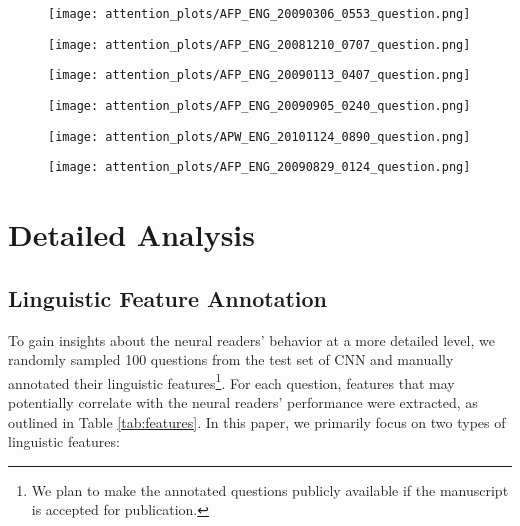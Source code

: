 \documentclass[11pt,a4paper]{article}
\begin{document}
\begin{figure*}[h]
\centering
\caption{Layer-wise attention visualization of GA Reader trained on WDW-Strict. See text for details.}
\begin{subfigure}[b]{\textwidth}
\centering
\texttt{[image: attention\_plots/AFP\_ENG\_20090306\_0553\_question.png]}
\end{subfigure}
\begin{subfigure}[b]{\textwidth}
\texttt{[image: attention\_plots/AFP\_ENG\_20081210\_0707\_question.png]}
\end{subfigure}
\end{figure*}

\begin{figure*}
\centering
\caption{\small Layer-wise attention visualization of GA Reader trained on WDW-Strict. See text for details.}
\begin{subfigure}[b]{\textwidth}
\centering
\texttt{[image: attention\_plots/AFP\_ENG\_20090113\_0407\_question.png]}
\end{subfigure}
\begin{subfigure}[b]{\textwidth}
\centering
\texttt{[image: attention\_plots/AFP\_ENG\_20090905\_0240\_question.png]}
\end{subfigure}
\end{figure*}

\begin{figure*}
\centering
\caption{\small Layer-wise attention visualization of GA Reader trained on WDW-Strict. See text for details.}
\begin{subfigure}[b]{\textwidth}
\centering
\texttt{[image: attention\_plots/APW\_ENG\_20101124\_0890\_question.png]}
\end{subfigure}
\begin{subfigure}[b]{\textwidth}
\centering
\texttt{[image: attention\_plots/AFP\_ENG\_20090829\_0124\_question.png]}
\end{subfigure}
\end{figure*}

\iffalse
\section{Detailed Analysis}
\label{sec:error}
\subsection{Linguistic Feature Annotation}
To gain insights about the neural readers' behavior at a more detailed level, we randomly sampled 100 questions from the test set of CNN and manually annotated their linguistic features\footnote{We plan to make the annotated questions publicly available if the manuscript is accepted for publication.}. For each question, features that may potentially correlate with the neural readers' performance were extracted, as outlined in Table \ref{tab:features}. In this paper, we primarily focus on two types of linguistic features:
\end{document}
